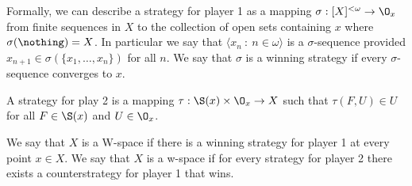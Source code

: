 \documentclass{article}
\begin{document}
Formally, we can describe a strategy for player 1 as a mapping \(\sigma: [X]^{<\omega} \to \O_x\) from finite sequences in \(X\) to the collection of open sets containing \(x\) where \(\sigma(\nothing) = X\). In particular we say that \(\langle x_n \: : \: n \in \omega\rangle\) is a \(\sigma\)-sequence provided \(x_{n + 1} \in \sigma(\{x_1, \dots, x_n\})\) for all \(n\). We say that \(\sigma\) is a winning strategy if every \(\sigma\)-sequence converges to \(x\).




A strategy for play 2 is a mapping \(\tau: \S(x) \times \O_x \to X\) such that \(\tau(F, U) \in U\) for all \(F \in \S(x)\) and \(U \in \O_x\).

\begin{defn}
    We say that \(X\) is a W-space if there is a winning strategy for player 1 at every point \(x \in X\).  We say that \(X\) is a w-space if for every strategy for player 2 there exists a counterstrategy for player 1 that wins.
\end{defn}
\end{document}
